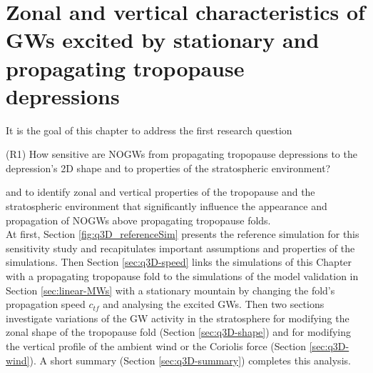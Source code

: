 \chapter{Zonal and vertical characteristics of GWs excited by stationary and propagating tropopause depressions}
\label{sec:resultsQ3D}
It is the goal of this chapter to address the first research question
\begin{tcolorbox}[]
    (R1) How sensitive are NOGWs from propagating tropopause depressions to the depression's 2D shape and to properties of the stratospheric environment?
\end{tcolorbox}
\noindent and to identify zonal and vertical properties of the tropopause and the stratospheric environment that significantly influence the appearance and propagation of NOGWs above propagating tropopause folds. \\
At first, Section \ref{fig:q3D_referenceSim} presents the reference simulation for this sensitivity study and recapitulates important assumptions and properties of the simulations. Then Section \ref{sec:q3D-speed} links the simulations of this Chapter with a propagating tropopause fold to the simulations of the model validation in Section \ref{sec:linear-MWs} with a stationary mountain by changing the fold's propagation speed $c_{tf}$ and analysing the excited GWs. Then two sections investigate variations of the GW activity in the stratosphere for modifying the zonal shape of the tropopause fold (Section \ref{sec:q3D-shape}) and for modifying the vertical profile of the ambient wind or the Coriolis force (Section \ref{sec:q3D-wind}).  A short summary (Section \ref{sec:q3D-summary}) completes this analysis.

